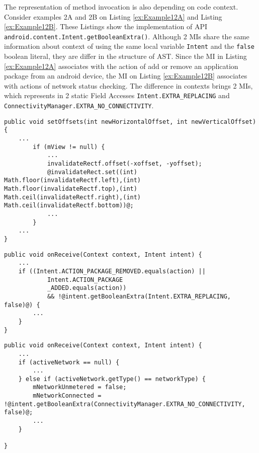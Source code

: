 The representation of method invocation is also depending on code context. Consider examples 2A and 2B on Listing  \ref{ex:Example12A} and Listing \ref{ex:Example12B}. These Listings show the implementation of API \texttt{android.content.Intent.getBooleanExtra()}. Although 2 MIs share the same information about context of using the same local variable \texttt{Intent} and the \texttt{false} boolean literal, they are differ in the structure of AST. Since the MI in Listing \ref{ex:Example12A} associates with the action of add or remove an application package from an android device, the MI on Listing \ref{ex:Example12B} associates with actions of network status checking. The difference in contexts brings 2 MIs, which represents in 2 static Field Accesses \texttt{Intent.EXTRA\_REPLACING} and \texttt{ConnectivityManager.EXTRA\_NO\_CONNECTIVITY}. \\
\noindent
\begin{minipage}[c]{0.3\textwidth}
\begin{lstlisting}[basicstyle=\tiny,caption={Example in \cite{id:Example11Complicate}},label={Example11Complicate}]
 public void setOffsets(int newHorizontalOffset, int newVerticalOffset) {
    ...
        if (mView != null) {
            ...
            invalidateRectf.offset(-xoffset, -yoffset);
            @invalidateRect.set((int) Math.floor(invalidateRectf.left),(int) Math.floor(invalidateRectf.top),(int) Math.ceil(invalidateRectf.right),(int) Math.ceil(invalidateRectf.bottom))@;
            ...
        }
    ...
}
\end{lstlisting}
\end{minipage}\hfill
\begin{minipage}[c]{0.3\textwidth}
\begin{lstlisting}[basicstyle=\tiny,caption={Example 2A in \cite{id:Example12A}},label={ex:Example12A},]
 public void onReceive(Context context, Intent intent) {
    ...
    if ((Intent.ACTION_PACKAGE_REMOVED.equals(action) ||
            Intent.ACTION_PACKAGE
            _ADDED.equals(action))
            && !@intent.getBooleanExtra(Intent.EXTRA_REPLACING, false)@) {
        ...
    }
}
\end{lstlisting}

\end{minipage}\hfill
\begin{minipage}[c]{.3\textwidth}
\begin{lstlisting}[basicstyle=\tiny,caption={Example 2B in \cite{id:Example12B}},label={ex:Example12B}]
public void onReceive(Context context, Intent intent) {
    ...
    if (activeNetwork == null) {
        ...
    } else if (activeNetwork.getType() == networkType) {
        mNetworkUnmetered = false;
        mNetworkConnected = !@intent.getBooleanExtra(ConnectivityManager.EXTRA_NO_CONNECTIVITY, false)@;
        ...
    }
    
}
\end{lstlisting}
\end{minipage}\hfill








